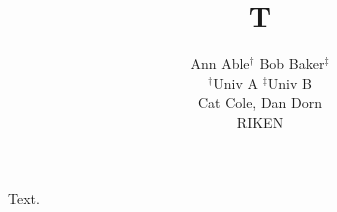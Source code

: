 \documentclass{article}
\title{T}
\author{Ann Able$^{\dagger}$ \quad Bob Baker$^{\ddagger}$ \\ $^\dagger$Univ A \quad $^\ddagger$Univ B \\ Cat Cole, Dan Dorn \\ RIKEN}
\begin{document}
\maketitle
Text.
\end{document}
